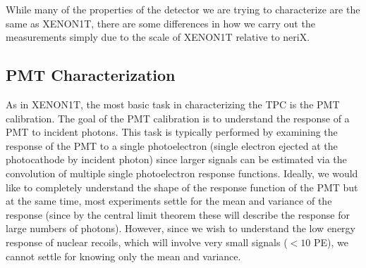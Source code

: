 While many of the properties of the detector we are trying to characterize are the same as XENON1T, there are some differences in how we carry out the measurements simply due to the scale of XENON1T relative to neriX.



\subsection{PMT Characterization}

As in XENON1T, the most basic task in characterizing the TPC is the PMT calibration.  The goal of the PMT calibration is to understand the response of a PMT to incident photons.  This task is typically performed by examining the response of the PMT to a single photoelectron (single electron ejected at the photocathode by incident photon) since larger signals can be estimated via the convolution of multiple single photoelectron response functions.  Ideally, we would like to completely understand the shape of the response function of the PMT but at the same time, most experiments settle for the mean and variance of the response (since by the central limit theorem these will describe the response for large numbers of photons).  However, since we wish to understand the low energy response of nuclear recoils, which will involve very small signals ($< 10$ PE), we cannot settle for knowing only the mean and variance.

